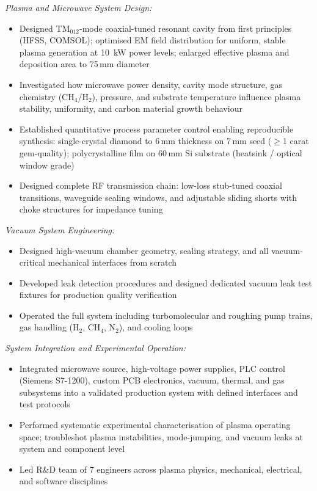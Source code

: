 \documentclass[a4paper,11pt]{article}
\begin{document}
\medskip
\noindent\textit{Plasma and Microwave System Design:}
\begin{itemize}[noitemsep, topsep=2pt, leftmargin=*]
    \item Designed TM$_{012}$-mode coaxial-tuned resonant cavity from first
          principles (HFSS, COMSOL); optimised EM field distribution for
          uniform, stable plasma generation at 10~kW power levels;
          enlarged effective plasma and deposition area to 75\,mm diameter
    \item Investigated how microwave power density, cavity mode structure,
          gas chemistry (CH$_4$/H$_2$), pressure, and substrate temperature
          influence plasma stability, uniformity, and carbon material
          growth behaviour
    \item Established quantitative process parameter control enabling
          reproducible synthesis: single-crystal diamond to 6\,mm thickness
          on 7\,mm seed ($\geq$1 carat gem-quality); polycrystalline film
          on 60\,mm Si substrate (heatsink / optical window grade)
    \item Designed complete RF transmission chain: low-loss stub-tuned
          coaxial transitions, waveguide sealing windows, and adjustable
          sliding shorts with choke structures for impedance tuning
\end{itemize}

\medskip
\noindent\textit{Vacuum System Engineering:}
\begin{itemize}[noitemsep, topsep=2pt, leftmargin=*]
    \item Designed high-vacuum chamber geometry, sealing strategy,
          and all vacuum-critical mechanical interfaces from scratch
    \item Developed leak detection procedures and designed dedicated
          vacuum leak test fixtures for production quality verification
    \item Operated the full system including turbomolecular and roughing
          pump trains, gas handling (H$_2$, CH$_4$, N$_2$), and cooling loops
\end{itemize}

\medskip
\noindent\textit{System Integration and Experimental Operation:}
\begin{itemize}[noitemsep, topsep=2pt, leftmargin=*]
    \item Integrated microwave source, high-voltage power supplies,
          PLC control (Siemens S7-1200), custom PCB electronics,
          vacuum, thermal, and gas subsystems into a validated
          production system with defined interfaces and test protocols
    \item Performed systematic experimental characterisation of plasma
          operating space; troubleshot plasma instabilities, mode-jumping,
          and vacuum leaks at system and component level
    \item Led R\&D team of 7 engineers across plasma physics, mechanical,
          electrical, and software disciplines
\end{itemize}
\end{document}

